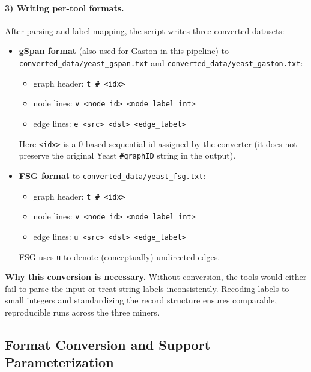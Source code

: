\documentclass[11pt]{article}
\begin{document}
\paragraph{3) Writing per-tool formats.}
After parsing and label mapping, the script writes three converted datasets:
\begin{itemize}
	\item \textbf{gSpan format} (also used for Gaston in this pipeline) to \texttt{converted\_data/yeast\_gspan.txt} and \texttt{converted\_data/yeast\_gaston.txt}:
	\begin{itemize}
		\item graph header: \texttt{t \# <idx>}
		\item node lines: \texttt{v <node\_id> <node\_label\_int>}
		\item edge lines: \texttt{e <src> <dst> <edge\_label>}
	\end{itemize}
	Here \texttt{<idx>} is a 0-based sequential id assigned by the converter (it does not preserve the original Yeast \texttt{\#graphID} string in the output).

	\item \textbf{FSG format} to \texttt{converted\_data/yeast\_fsg.txt}:
	\begin{itemize}
		\item graph header: \texttt{t \# <idx>}
		\item node lines: \texttt{v <node\_id> <node\_label\_int>}
		\item edge lines: \texttt{u <src> <dst> <edge\_label>}
	\end{itemize}
	FSG uses \texttt{u} to denote (conceptually) undirected edges.
\end{itemize}

\noindent\textbf{Why this conversion is necessary.} Without conversion, the tools would either fail to parse the input or treat string labels inconsistently.
Recoding labels to small integers and standardizing the record structure ensures comparable, reproducible runs across the three miners.

\subsection{Format Conversion and Support Parameterization}
\end{document}
